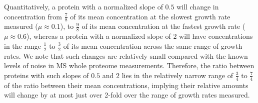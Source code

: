 Quantitatively, a protein with a normalized slope of $0.5$ will change in concentration from $\frac{7}{8}$ of its mean concentration at the slowest growth rate measured ($\mu \approx 0.1$), to $\frac{9}{8}$ of its mean concentration at the fastest growth rate ($\mu \approx 0.6$), whereas a protein with a normalized slope of $2$ will have concentrations in the range $\frac{1}{2}$ to $\frac{3}{2}$ of its mean concentration across the same range of growth rates.
We note that such changes are relatively small compared with the known levels of noise in MS whole proteome measurements.
Therefore, the ratio between proteins with such slopes of $0.5$ and $2$ lies in the relatively narrow range of $\frac{3}{4}$ to $\frac{7}{4}$ of the ratio between their mean concentrations, implying their relative amounts will change by at most just over 2-fold over the range of growth rates measured.